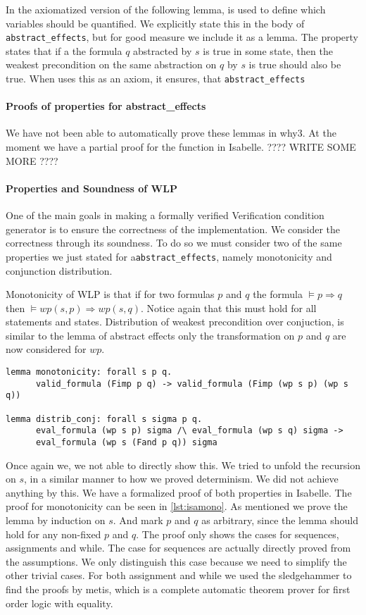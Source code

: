 In \cite{TODO} the axiomatized version of the following lemma, is used to define which variables should be quantified.
We explicitly state this in the body of \texttt{abstract\_effects},
but for good measure we include it as a lemma. The property states that if a the formula $q$ abstracted by $s$ is true in some state, then the weakest precondition on the same abstraction on $q$ by $s$ is true should also be true. When \cite{} uses this as an axiom, it ensures, that \texttt{abstract\_effects}

\paragraph{Proofs of properties for abstract\_effects}
We have not been able to automatically prove these lemmas in why3.
At the moment we have a partial proof for the function in Isabelle.
???? WRITE SOME MORE ????

\paragraph{Properties and Soundness of WLP}
One of the main goals in making a formally verified Verification condition generator is to ensure the correctness of the implementation.
We consider the correctness through its soundness.
To do so we must consider two of the same properties we just stated for a\texttt{abstract\_effects}, namely monotonicity and conjunction distribution.

Monotonicity of WLP is that if for two formulas $p$ and $q$ the formula $\vDash p \Rightarrow q$ then $\vDash wp(s, p) \Rightarrow wp(s,q)$. Notice again that this must hold for all statements and states.
Distribution of weakest precondition over conjuction, is similar to the lemma of abstract effects only the transformation on $p$ and $q$ are now considered for $wp$.

\begin{lstlisting}
lemma monotonicity: forall s p q.
      valid_formula (Fimp p q) -> valid_formula (Fimp (wp s p) (wp s q))

lemma distrib_conj: forall s sigma p q.
      eval_formula (wp s p) sigma /\ eval_formula (wp s q) sigma ->
      eval_formula (wp s (Fand p q)) sigma
\end{lstlisting}

Once again we, we not able to directly show this. We tried to unfold the recursion on $s$, in a similar manner to how we proved determinism.
We did not achieve anything by this.
We have a formalized proof of both properties in Isabelle.
The proof for monotonicity can be seen in \autoref{lst:isamono}.
As mentioned we prove the lemma by induction on $s$.
And mark $p$ and $q$ as arbitrary, since the lemma should hold for any non-fixed $p$ and $q$.
The proof only shows the cases for sequences, assignments and while.
The case for sequences are actually directly proved from the assumptions.
We only distinguish this case because we need to simplify the other trivial cases.
For both assignment and while we used the sledgehammer to find the proofs by metis,
which is a complete automatic theorem prover for first order logic with equality\cite{TODO sledgehammer paper}.


